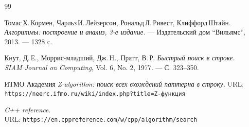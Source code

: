 \begin{thebibliography}{99}

Томас\,Х.\,Кормен, Чарльз\,И.\,Лейзерсон, Рональд\,Л.\,Ривест, Клиффорд\,Штайн.
{\itshape Алгоритмы: построение и анализ, 3-е издание.} --- Издательский дом \enquote{Вильямс}, 2013. --- 1328 с.

Кнут, Д.\,Е., Моррис-младший, Дж.\,H., Пратт, В.\,Р.
{\itshape Быстрый поиск в строке.}
{\itshape SIAM Journal on Computing}, Vol. 6, No. 2, 1977. --- С. 323--350.

ИТМО Академия
{\itshape Z-algorithm: поиск всех вхождений паттерна в строку.}
URL: \texttt{https://neerc.ifmo.ru/wiki/index.php?title=Z-функция}

{\itshape C++ reference.} \\URL: \texttt{https://en.cppreference.com/w/cpp/algorithm/search}

\end{thebibliography}
\pagebreak
